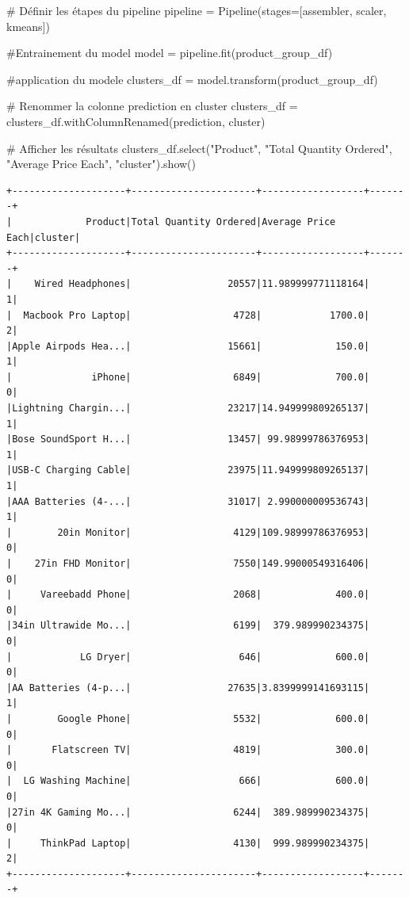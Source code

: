 \documentclass[
  letterpaper,
  DIV=11,
  numbers=noendperiod]{scrartcl}
\newenvironment{Shaded}{\begin{snugshade}}{\end{snugshade}}
\newcommand{\CommentTok}[1]{\textcolor[rgb]{0.37,0.37,0.37}{#1}}
\newcommand{\NormalTok}[1]{\textcolor[rgb]{0.00,0.23,0.31}{#1}}
\newcommand{\OperatorTok}[1]{\textcolor[rgb]{0.37,0.37,0.37}{#1}}
\newcommand{\StringTok}[1]{\textcolor[rgb]{0.13,0.47,0.30}{#1}}
\begin{document}
\begin{Shaded}
\begin{Highlighting}[]
\CommentTok{\# Définir les étapes du pipeline}
\NormalTok{pipeline }\OperatorTok{=}\NormalTok{ Pipeline(stages}\OperatorTok{=}\NormalTok{[assembler, scaler, kmeans])}

\CommentTok{\#Entrainement du model}
\NormalTok{model }\OperatorTok{=}\NormalTok{ pipeline.fit(product\_group\_df)}

\CommentTok{\#application du modele}
\NormalTok{clusters\_df }\OperatorTok{=}\NormalTok{ model.transform(product\_group\_df)}

\CommentTok{\# Renommer la colonne \textquotesingle{}prediction\textquotesingle{} en \textquotesingle{}cluster\textquotesingle{}}
\NormalTok{clusters\_df }\OperatorTok{=}\NormalTok{ clusters\_df.withColumnRenamed(}\StringTok{\textquotesingle{}prediction\textquotesingle{}}\NormalTok{, }\StringTok{\textquotesingle{}cluster\textquotesingle{}}\NormalTok{)}

\CommentTok{\# Afficher les résultats}
\NormalTok{clusters\_df.select(}\StringTok{"Product"}\NormalTok{, }\StringTok{"Total Quantity Ordered"}\NormalTok{, }\StringTok{"Average Price Each"}\NormalTok{, }\StringTok{"cluster"}\NormalTok{).show()}


\end{Highlighting}
\end{Shaded}

\begin{verbatim}
+--------------------+----------------------+------------------+-------+
|             Product|Total Quantity Ordered|Average Price Each|cluster|
+--------------------+----------------------+------------------+-------+
|    Wired Headphones|                 20557|11.989999771118164|      1|
|  Macbook Pro Laptop|                  4728|            1700.0|      2|
|Apple Airpods Hea...|                 15661|             150.0|      1|
|              iPhone|                  6849|             700.0|      0|
|Lightning Chargin...|                 23217|14.949999809265137|      1|
|Bose SoundSport H...|                 13457| 99.98999786376953|      1|
|USB-C Charging Cable|                 23975|11.949999809265137|      1|
|AAA Batteries (4-...|                 31017| 2.990000009536743|      1|
|        20in Monitor|                  4129|109.98999786376953|      0|
|    27in FHD Monitor|                  7550|149.99000549316406|      0|
|     Vareebadd Phone|                  2068|             400.0|      0|
|34in Ultrawide Mo...|                  6199|  379.989990234375|      0|
|            LG Dryer|                   646|             600.0|      0|
|AA Batteries (4-p...|                 27635|3.8399999141693115|      1|
|        Google Phone|                  5532|             600.0|      0|
|       Flatscreen TV|                  4819|             300.0|      0|
|  LG Washing Machine|                   666|             600.0|      0|
|27in 4K Gaming Mo...|                  6244|  389.989990234375|      0|
|     ThinkPad Laptop|                  4130|  999.989990234375|      2|
+--------------------+----------------------+------------------+-------+
\end{verbatim}
\end{document}
